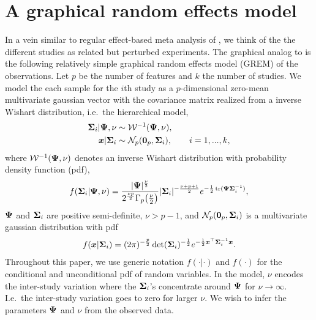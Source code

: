 \documentclass{article}\usepackage[]{graphicx}\usepackage[]{color}
\begin{document}
\section{A graphical random effects model}
In a vein similar to regular effect-based meta analysis of \citet{Choi2003}, we think of the the different studies as related but perturbed experiments. The graphical analog to \citet{Choi2003} is the following relatively simple graphical random effects model (GREM) of the observations.
Let $p$ be the number of features and $k$ the number of studies. We model the each sample for the $i$th study as a $p$-dimensional zero-mean multivariate gaussian vector with the covariance matrix realized from a inverse Wishart distribution, i.e.\ the hierarchical model,
\begin{align}
\begin{split} \label{eq:REM}
  {\boldsymbol{\Sigma}}_i | {\boldsymbol{\Psi}}, \nu  &\sim \mathcal{W}^{-1}({\boldsymbol{\Psi}}, \nu), \\
  \boldsymbol{x} | {\boldsymbol{\Sigma}}_i &\sim \mathcal{N}_p(\boldsymbol{0}_p, {\boldsymbol{\Sigma}}_i), \qquad i = 1, ..., k,
\end{split}
\end{align}
where $\mathcal{W}^{-1}({\boldsymbol{\Psi}}, \nu)$ denotes an inverse Wishart distribution with probability density function (pdf),
\begin{align*}
  f({\boldsymbol{\Sigma}}_i | {\boldsymbol{\Psi}}, \nu) =
  \frac{ |{\boldsymbol{\Psi}}|^\frac{\nu}{2} }{
        2^\frac{\nu p}{2} \Gamma_p\!\left( \frac{\nu}{2} \right) }
        |{\boldsymbol{\Sigma}}_i|^{-\frac{\nu+p+1}{2}}
  e^{-\frac{1}{2} \operatorname*{tr}({\boldsymbol{\Psi}}{\boldsymbol{\Sigma}}_i^{-1})},
\end{align*}
${\boldsymbol{\Psi}}$ and ${\boldsymbol{\Sigma}}_i$ are positive semi-definite, $\nu > p - 1$, and $\mathcal{N}_p(\boldsymbol{0}_p, {\boldsymbol{\Sigma}}_i)$ is a multivariate gaussian distribution with pdf
\begin{align*}
f(\boldsymbol{x} | {\boldsymbol{\Sigma}}_i) =
  (2\pi)^{-\frac{p}{2}} \det({\boldsymbol{\Sigma}}_i)^{-\frac{1}{2}}
  e^{ -\frac{1}{2}\boldsymbol{x}^\top {\boldsymbol{\Sigma}}_i^{-1}{\boldsymbol{x}} }.
\end{align*}
Throughout this paper, we use generic notation $f(\cdot | \cdot)$ and $f(\cdot)$ for the conditional and unconditional pdf of random variables.
In the model, $\nu$ encodes the inter-study variation where the ${\boldsymbol{\Sigma}}_i$'s concentrate around ${\boldsymbol{\Psi}}$ for $\nu\to\infty$. I.e.\ the inter-study variation goes to zero for larger $\nu$. We wish to infer the parameters ${\boldsymbol{\Psi}}$ and $\nu$ from the observed data.
\end{document}
